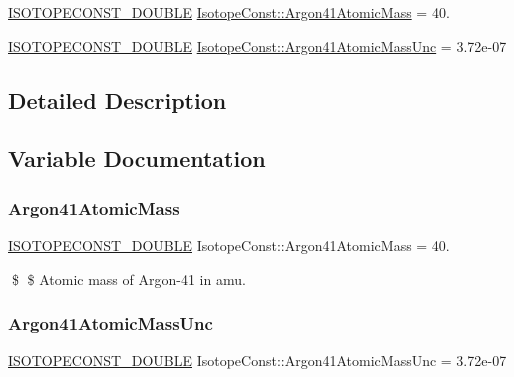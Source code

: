 \begin{DoxyCompactItemize}
\item 
\mbox{\hyperlink{group___isotope_const-_macros_ga8f45a7272ce02c0b4c65c44636ed719a}{I\+S\+O\+T\+O\+P\+E\+C\+O\+N\+S\+T\+\_\+\+D\+O\+U\+B\+LE}} \mbox{\hyperlink{group___isotope_const-_argon-_ar41_ga3e39a4daca131432ddf4814c509d9e03}{Isotope\+Const\+::\+Argon41\+Atomic\+Mass}} = 40.
\item 
\mbox{\hyperlink{group___isotope_const-_macros_ga8f45a7272ce02c0b4c65c44636ed719a}{I\+S\+O\+T\+O\+P\+E\+C\+O\+N\+S\+T\+\_\+\+D\+O\+U\+B\+LE}} \mbox{\hyperlink{group___isotope_const-_argon-_ar41_gacafa330f2b45d81a6aea44e76551e618}{Isotope\+Const\+::\+Argon41\+Atomic\+Mass\+Unc}} = 3.\+72e-\/07
\end{DoxyCompactItemize}


\subsection{Detailed Description}


\subsection{Variable Documentation}
\mbox{\label{group___isotope_const-_argon-_ar41_ga3e39a4daca131432ddf4814c509d9e03}} 
\subsubsection{\texorpdfstring{Argon41\+Atomic\+Mass}{Argon41AtomicMass}}
{\footnotesize\ttfamily \mbox{\hyperlink{group___isotope_const-_macros_ga8f45a7272ce02c0b4c65c44636ed719a}{I\+S\+O\+T\+O\+P\+E\+C\+O\+N\+S\+T\+\_\+\+D\+O\+U\+B\+LE}} Isotope\+Const\+::\+Argon41\+Atomic\+Mass = 40.}

\$ \$ Atomic mass of Argon-\/41 in amu. \mbox{\label{group___isotope_const-_argon-_ar41_gacafa330f2b45d81a6aea44e76551e618}} 
\subsubsection{\texorpdfstring{Argon41\+Atomic\+Mass\+Unc}{Argon41AtomicMassUnc}}
{\footnotesize\ttfamily \mbox{\hyperlink{group___isotope_const-_macros_ga8f45a7272ce02c0b4c65c44636ed719a}{I\+S\+O\+T\+O\+P\+E\+C\+O\+N\+S\+T\+\_\+\+D\+O\+U\+B\+LE}} Isotope\+Const\+::\+Argon41\+Atomic\+Mass\+Unc = 3.\+72e-\/07}

